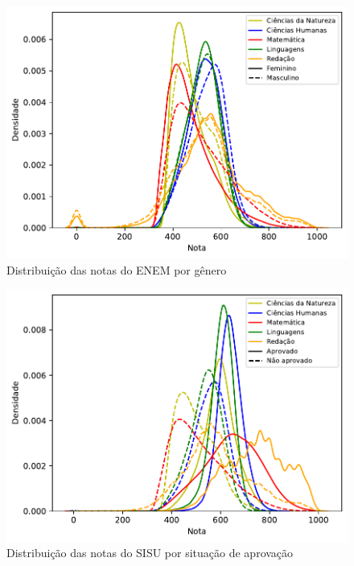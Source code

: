 \begin{figure}[h]
    \centering
    \includegraphics{figuras/distribuicao_notas_enem.pdf}
    \caption{Distribuição das notas do ENEM por gênero}
    \label{fig:nota-genero}
\end{figure}
            
\begin{figure}[h]
    \centering
    \includegraphics{figuras/distribuicao_notas_sisu.pdf}\caption{Distribuição das notas do SISU por situação de aprovação}
    \label{fig:nota-aprovacao}
\end{figure}
    
